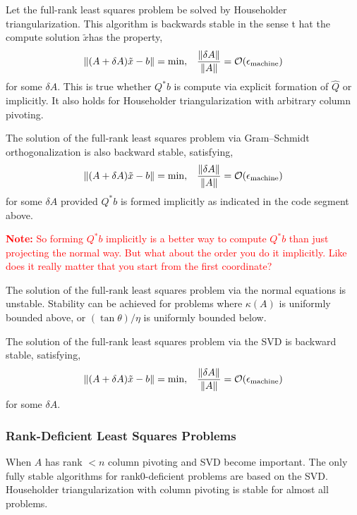 \documentclass[12pt]{article}
\newcommand{\note}[1]{\textcolor{red}{\textbf{Note:} #1}}
\begin{document}
\begin{theorem}
Let the full-rank least squares problem be solved by Householder triangularization. This algorithm is backwards stable in the sense t hat the compute solution \( \tilde{x} \)has the property,
\begin{align*}
    \left\lVert(A+\delta A)\tilde{x} - b\right\rVert = \text{min}, && \dfrac{\left\lVert\delta A\right\rVert}{\left\lVert A\right\rVert} = \mathcal{O}(\epsilon_\text{machine})
\end{align*}
for some \( \delta A \). This is true whether \( Q^*b \) is compute via explicit formation of \( \hat{Q} \) or implicitly. It also holds for Householder triangularization with arbitrary column pivoting.
\end{theorem}

\begin{theorem}
The solution of the full-rank least squares problem via Gram--Schmidt orthogonalization is also backward stable, satisfying,\begin{align*}
    \left\lVert(A+\delta A)\tilde{x} - b\right\rVert = \text{min}, && \dfrac{\left\lVert\delta A\right\rVert}{\left\lVert A\right\rVert} = \mathcal{O}(\epsilon_\text{machine})
\end{align*}
for some \( \delta A \) provided \( Q^*b \) is formed implicitly as indicated in the code segment above.
\end{theorem}

\note{So forming \( Q^*b \) implicitly is a better way to compute \( Q^*b \) than just projecting the normal way. But what about the order you do it implicitly. Like does it really matter that you start from the first coordinate?}

\begin{theorem}
The solution of the full-rank least squares problem via the normal equations is unstable. Stability can be achieved for problems where \( \kappa(A) \) is uniformly bounded above, or \( (\tan \theta )/ \eta \) is uniformly bounded below.
\end{theorem}

\begin{theorem}
The solution of the full-rank least squares problem via the SVD is backward stable, satisfying,
\begin{align*}
    \left\lVert(A+\delta A)\tilde{x} - b\right\rVert = \text{min}, && \dfrac{\left\lVert\delta A\right\rVert}{\left\lVert A\right\rVert} = \mathcal{O}(\epsilon_\text{machine})
\end{align*}
for some \( \delta A \).
\end{theorem}


\subsubsection{Rank-Deficient Least Squares Problems}
When \( A \) has rank \( < n \) column pivoting and SVD become important. The only fully stable algorithms for rank0-deficient problems are based on the SVD. Householder triangularization with column pivoting is stable for almost all problems.
\end{document}
